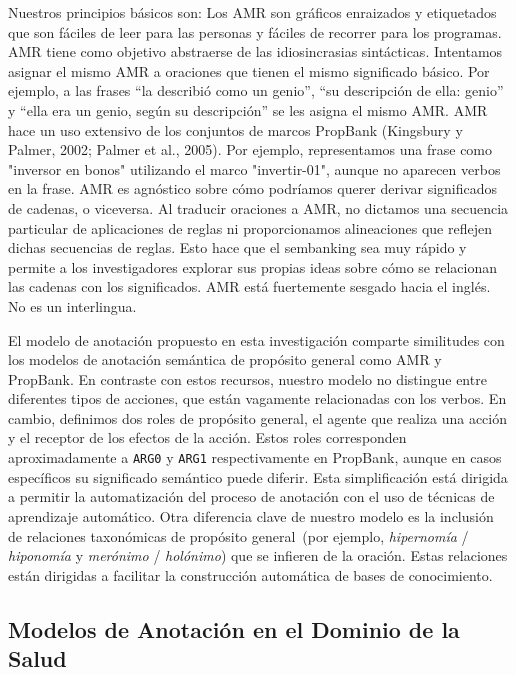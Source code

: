 Nuestros principios básicos son:
Los AMR son gráficos enraizados y etiquetados que son fáciles de leer para las personas y fáciles de recorrer para los programas.
AMR tiene como objetivo abstraerse de las idiosincrasias sintácticas. Intentamos asignar el
mismo AMR a oraciones que tienen el mismo significado básico. Por ejemplo, a las frases “la describió como un genio”, “su descripción de ella: genio” y “ella era un genio, según su descripción” se les asigna el mismo AMR.
AMR hace un uso extensivo de los conjuntos de marcos PropBank (Kingsbury y Palmer, 2002; Palmer et al., 2005). Por ejemplo, representamos una frase como "inversor en bonos" utilizando el marco "invertir-01", aunque no aparecen verbos en la frase.
AMR es agnóstico sobre cómo podríamos querer derivar significados de cadenas, o viceversa. Al traducir oraciones a AMR, no dictamos una secuencia particular de aplicaciones de reglas ni proporcionamos alineaciones que reflejen dichas secuencias de reglas. Esto hace que el sembanking sea muy rápido y permite a los investigadores explorar sus propias ideas sobre cómo se relacionan las cadenas con los significados.
AMR está fuertemente sesgado hacia el inglés. No es un interlingua.

El modelo de anotación propuesto en esta investigación comparte similitudes con los modelos de anotación semántica de propósito general como AMR y PropBank.
En contraste con estos recursos, nuestro modelo no distingue entre diferentes tipos de acciones, que están vagamente relacionadas con los verbos. En cambio, definimos dos roles de propósito general, el agente que realiza una acción y el receptor de los efectos de la acción. Estos roles corresponden aproximadamente a \texttt{ARG0} y \texttt{ARG1} respectivamente en PropBank, aunque en casos específicos su significado semántico puede diferir.
Esta simplificación está dirigida a permitir la automatización del proceso de anotación con el uso de técnicas de aprendizaje automático.
Otra diferencia clave de nuestro modelo es la inclusión de relaciones taxonómicas de propósito general~(por ejemplo, \textit{hipernomía} / \textit{hiponomía} y \textit{merónimo} / \textit{holónimo}) que se infieren de la oración. Estas relaciones están dirigidas a facilitar la construcción automática de bases de conocimiento.

\subsection{Modelos de Anotación en el Dominio de la Salud}\label{sec:health}

